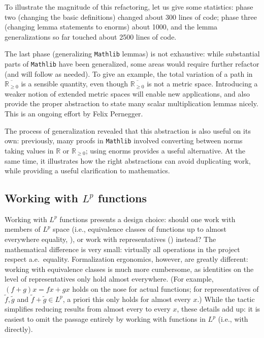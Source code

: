 \documentclass[12pt]{amsart}
\newcommand*{\real}{\mathbb{R}} %
\newcommand{\nnreal}{\real_{\ge0}}
\newcommand{\ennreal}{\overline{\real_{\ge0}}}
\newcommand{\mathlib}{\texttt{Mathlib}\xspace}
\theoremstyle{definition}
\theoremstyle{plain}
\begin{document}
To illustrate the magnitude of this refactoring, let us give some statistics: phase two (changing the basic definitions) changed about 300 lines of code; phase three (changing lemma statements to enorms) about 1000, and the lemma generalizations so far touched about 2500 lines of code.

The last phase (generalizing \mathlib lemmas) is not exhaustive: while substantial parts of \mathlib have been generalized, some areas would require further refactor (and will follow as needed). To give an example, the total variation of a path in $\ennreal$ is a sensible quantity, even though $\ennreal$ is not a metric space. Introducing a weaker notion of extended metric spaces will enable new applications, and also provide the proper abstraction to state many scalar multiplication lemmas nicely. This is an ongoing effort by Felix Pernegger.

The process of generalization revealed that this abstraction is also useful on its own: previously, many proofs in \mathlib involved converting between norms taking values in $\real$ or $\nnreal$; using enorms provides a useful alternative. At the same time, it illustrates how the right abstractions can avoid duplicating work, while providing a useful clarification to mathematics.

\subsection{Working with \texorpdfstring{$L^p$}{L\^{}p} functions}\label{subsec:Lp}

Working with $L^p$ functions presents a design choice: should one work with members of $L^p$ space (i.e., equivalence classes of functions up to almost everywhere equality, ), or work with representatives () instead?
The mathematical difference is very small: virtually all operations in the project respect a.e.\ equality.
Formalization ergonomics, however, are greatly different: working with equivalence classes is much more cumbersome, as identities on the level of representatives only hold almost everywhere.
(For example, $(f+g)x = f x + g x$ holds on the nose for actual functions; for representatives of $\tilde{f},\tilde{g}$ and $\tilde{f}+\tilde{g}\in L^p$, a priori this only holds for almost every $x$.)
While the  tactic simplifies reducing results from almost every to every $x$, these details add up: it is easiest to omit the passage entirely by working with functions in $L^p$ (i.e., with  directly).
\end{document}
